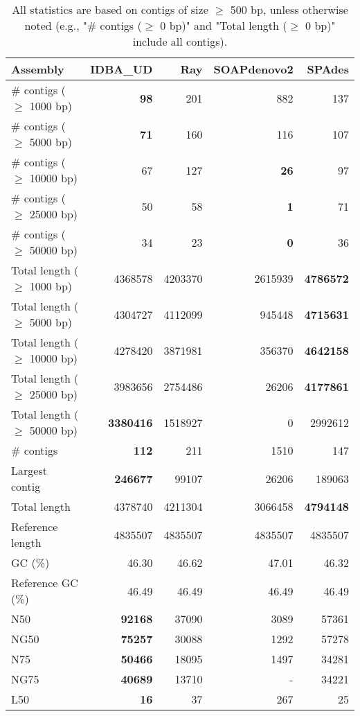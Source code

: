 \documentclass[12pt,a4paper]{article}
\begin{document}
\begin{table}[ht]
\begin{center}
\caption{All statistics are based on contigs of size $\geq$ 500 bp, unless otherwise noted (e.g., "\# contigs ($\geq$ 0 bp)" and "Total length ($\geq$ 0 bp)" include all contigs).}
\begin{tabular}{|l*{4}{|r}|}
\hline
Assembly & IDBA\_UD & Ray & SOAPdenovo2 & SPAdes \\ \hline
\# contigs ($\geq$ 1000 bp) & {\bf 98} & 201 & 882 & 137 \\ \hline
\# contigs ($\geq$ 5000 bp) & {\bf 71} & 160 & 116 & 107 \\ \hline
\# contigs ($\geq$ 10000 bp) & 67 & 127 & {\bf 26} & 97 \\ \hline
\# contigs ($\geq$ 25000 bp) & 50 & 58 & {\bf 1} & 71 \\ \hline
\# contigs ($\geq$ 50000 bp) & 34 & 23 & {\bf 0} & 36 \\ \hline
Total length ($\geq$ 1000 bp) & 4368578 & 4203370 & 2615939 & {\bf 4786572} \\ \hline
Total length ($\geq$ 5000 bp) & 4304727 & 4112099 & 945448 & {\bf 4715631} \\ \hline
Total length ($\geq$ 10000 bp) & 4278420 & 3871981 & 356370 & {\bf 4642158} \\ \hline
Total length ($\geq$ 25000 bp) & 3983656 & 2754486 & 26206 & {\bf 4177861} \\ \hline
Total length ($\geq$ 50000 bp) & {\bf 3380416} & 1518927 & 0 & 2992612 \\ \hline
\# contigs & {\bf 112} & 211 & 1510 & 147 \\ \hline
Largest contig & {\bf 246677} & 99107 & 26206 & 189063 \\ \hline
Total length & 4378740 & 4211304 & 3066458 & {\bf 4794148} \\ \hline
Reference length & 4835507 & 4835507 & 4835507 & 4835507 \\ \hline
GC (\%) & 46.30 & 46.62 & 47.01 & 46.32 \\ \hline
Reference GC (\%) & 46.49 & 46.49 & 46.49 & 46.49 \\ \hline
N50 & {\bf 92168} & 37090 & 3089 & 57361 \\ \hline
NG50 & {\bf 75257} & 30088 & 1292 & 57278 \\ \hline
N75 & {\bf 50466} & 18095 & 1497 & 34281 \\ \hline
NG75 & {\bf 40689} & 13710 & - & 34221 \\ \hline
L50 & {\bf 16} & 37 & 267 & 25 \\ \hline

\end{tabular}
\end{center}
\end{table}
\end{document}
